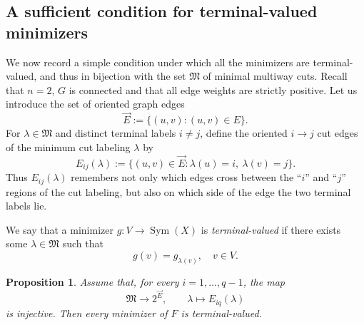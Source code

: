 \documentclass[11pt,oneside,letterpaper]{article}
\numberwithin{equation}{section}
\newtheorem{proposition}[theorem]{Proposition}
\theoremstyle{definition}
\theoremstyle{remark}
\DeclareMathOperator{\Sym}{Sym}
\begin{document}
\subsection{A sufficient condition for terminal-valued minimizers}

We now record a simple condition under which all the minimizers are terminal-valued, and thus in bijection with the set $\mathfrak M$ of minimal multiway cuts. Recall that $n=2$, $G$ is connected and that all edge weights are strictly positive.  Let us introduce the set of oriented graph edges
\begin{equation}
  \overrightarrow E
  :=
  \{(u,v):(u,v)\in E\}.
\end{equation}
For $\lambda\in\mathfrak{M}$ and distinct terminal labels $i\ne j$, define the oriented
$i \to j$ cut edges of the minimum cut labeling $\lambda$ by
\begin{equation}\label{eq:oriented-crossing-pattern}
  E_{ij}(\lambda)
  :=
  \{(u,v)\in\overrightarrow E:
  \lambda(u)=i,\ \lambda(v)=j\}.
\end{equation}
Thus $E_{ij}(\lambda)$ remembers not only which edges cross between the ``$i$'' and ``$j$'' regions of the cut labeling, but also on which side of the edge the two terminal labels lie.

We say that a minimizer $g:V\to \Sym(X)$ is \emph{terminal-valued} if there
exists some $\lambda\in\mathfrak{M}$ such that
\begin{equation}
  g(v)=g_{\lambda(v)},\quad v\in V.
\end{equation}

\begin{proposition}\label{prop:oriented-edge-pattern-rigidity}
Assume that, for every $i=1,\ldots,q-1$, the map
\begin{equation}\label{eq:star-oriented-pattern-injectivity}
  \mathfrak{M}\to 2^{\overrightarrow E},
  \qquad
  \lambda\mapsto E_{iq}(\lambda)
\end{equation}
is \emph{injective}.  Then every minimizer of $F$ is terminal-valued.
\end{proposition}
\end{document}
